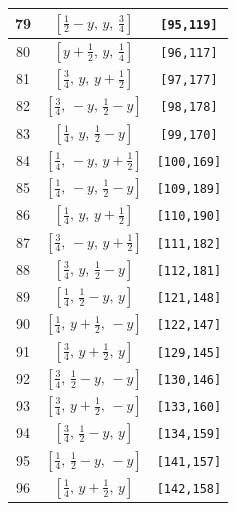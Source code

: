 \documentclass[fleqn,8pt]{jsarticle}
\begin{document}
\begin{longtable}{ccc}
79 & $\left[ \frac{1}{2} - y,\, y,\, \frac{3}{4} \right]$ & {\tt [95,119]} \\ \hline
80 & $\left[ y + \frac{1}{2},\, y,\, \frac{1}{4} \right]$ & {\tt [96,117]} \\ \hline
81 & $\left[ \frac{3}{4},\, y,\, y + \frac{1}{2} \right]$ & {\tt [97,177]} \\ \hline
82 & $\left[ \frac{3}{4},\, - y,\, \frac{1}{2} - y \right]$ & {\tt [98,178]} \\ \hline
83 & $\left[ \frac{1}{4},\, y,\, \frac{1}{2} - y \right]$ & {\tt [99,170]} \\ \hline
84 & $\left[ \frac{1}{4},\, - y,\, y + \frac{1}{2} \right]$ & {\tt [100,169]} \\ \hline
85 & $\left[ \frac{1}{4},\, - y,\, \frac{1}{2} - y \right]$ & {\tt [109,189]} \\ \hline
86 & $\left[ \frac{1}{4},\, y,\, y + \frac{1}{2} \right]$ & {\tt [110,190]} \\ \hline
87 & $\left[ \frac{3}{4},\, - y,\, y + \frac{1}{2} \right]$ & {\tt [111,182]} \\ \hline
88 & $\left[ \frac{3}{4},\, y,\, \frac{1}{2} - y \right]$ & {\tt [112,181]} \\ \hline
89 & $\left[ \frac{1}{4},\, \frac{1}{2} - y,\, y \right]$ & {\tt [121,148]} \\ \hline
90 & $\left[ \frac{1}{4},\, y + \frac{1}{2},\, - y \right]$ & {\tt [122,147]} \\ \hline
91 & $\left[ \frac{3}{4},\, y + \frac{1}{2},\, y \right]$ & {\tt [129,145]} \\ \hline
92 & $\left[ \frac{3}{4},\, \frac{1}{2} - y,\, - y \right]$ & {\tt [130,146]} \\ \hline
93 & $\left[ \frac{3}{4},\, y + \frac{1}{2},\, - y \right]$ & {\tt [133,160]} \\ \hline
94 & $\left[ \frac{3}{4},\, \frac{1}{2} - y,\, y \right]$ & {\tt [134,159]} \\ \hline
95 & $\left[ \frac{1}{4},\, \frac{1}{2} - y,\, - y \right]$ & {\tt [141,157]} \\ \hline
96 & $\left[ \frac{1}{4},\, y + \frac{1}{2},\, y \right]$ & {\tt [142,158]} \\
\end{longtable}
\renewcommand{\arraystretch}{1.2}
\end{document}

